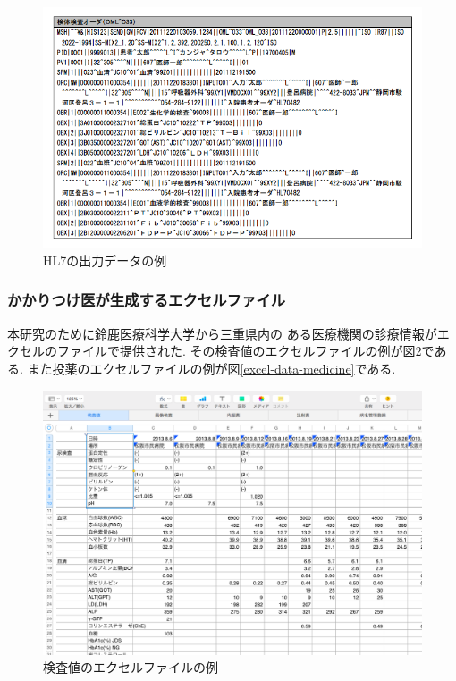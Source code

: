 	\begin{figure}[htbp]
    \begin{center}
			\includegraphics[width=12cm, bb=0 0 688 437, clip]{./gazou/ss-mix_sampledata.png}
    \end{center}
    \caption{HL7の出力データの例}
		\label{ss-mix_sampledata}
	\end{figure}



  \subsubsection{かかりつけ医が生成するエクセルファイル}
  本研究のために鈴鹿医療科学大学から三重県内の
  ある医療機関の診療情報がエクセルのファイルで提供された.
  その検査値のエクセルファイルの例が図\ref{excel-data}である.
  また投薬のエクセルファイルの例が図\ref{excel-data-medicine}である.


  \begin{figure}[htbp]
    \begin{center}
      \includegraphics[width=13cm, bb=0 0 1049 733]{./gazou/excel-data.png}
    \end{center}
    \caption{検査値のエクセルファイルの例}
    \label{excel-data}
  \end{figure}

